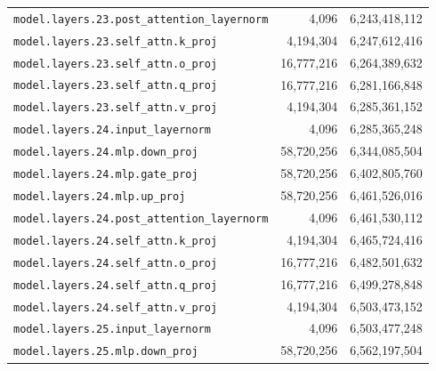 \documentclass[10pt,a4paper]{article}
\theoremstyle{definition}
\begin{document}
\begin{appendices}
\begin{longtable}{p{9.5cm}rr}
\texttt{model.\allowbreak{}layers.\allowbreak{}23.\allowbreak{}post\_attention\_layernorm} & 4,096 & 6,243,418,112 \\
\texttt{model.\allowbreak{}layers.\allowbreak{}23.\allowbreak{}self\_attn.\allowbreak{}k\_proj} & 4,194,304 & 6,247,612,416 \\
\texttt{model.\allowbreak{}layers.\allowbreak{}23.\allowbreak{}self\_attn.\allowbreak{}o\_proj} & 16,777,216 & 6,264,389,632 \\
\texttt{model.\allowbreak{}layers.\allowbreak{}23.\allowbreak{}self\_attn.\allowbreak{}q\_proj} & 16,777,216 & 6,281,166,848 \\
\texttt{model.\allowbreak{}layers.\allowbreak{}23.\allowbreak{}self\_attn.\allowbreak{}v\_proj} & 4,194,304 & 6,285,361,152 \\
\texttt{model.\allowbreak{}layers.\allowbreak{}24.\allowbreak{}input\_layernorm} & 4,096 & 6,285,365,248 \\
\texttt{model.\allowbreak{}layers.\allowbreak{}24.\allowbreak{}mlp.\allowbreak{}down\_proj} & 58,720,256 & 6,344,085,504 \\
\texttt{model.\allowbreak{}layers.\allowbreak{}24.\allowbreak{}mlp.\allowbreak{}gate\_proj} & 58,720,256 & 6,402,805,760 \\
\texttt{model.\allowbreak{}layers.\allowbreak{}24.\allowbreak{}mlp.\allowbreak{}up\_proj} & 58,720,256 & 6,461,526,016 \\
\texttt{model.\allowbreak{}layers.\allowbreak{}24.\allowbreak{}post\_attention\_layernorm} & 4,096 & 6,461,530,112 \\
\texttt{model.\allowbreak{}layers.\allowbreak{}24.\allowbreak{}self\_attn.\allowbreak{}k\_proj} & 4,194,304 & 6,465,724,416 \\
\texttt{model.\allowbreak{}layers.\allowbreak{}24.\allowbreak{}self\_attn.\allowbreak{}o\_proj} & 16,777,216 & 6,482,501,632 \\
\texttt{model.\allowbreak{}layers.\allowbreak{}24.\allowbreak{}self\_attn.\allowbreak{}q\_proj} & 16,777,216 & 6,499,278,848 \\
\texttt{model.\allowbreak{}layers.\allowbreak{}24.\allowbreak{}self\_attn.\allowbreak{}v\_proj} & 4,194,304 & 6,503,473,152 \\
\texttt{model.\allowbreak{}layers.\allowbreak{}25.\allowbreak{}input\_layernorm} & 4,096 & 6,503,477,248 \\
\texttt{model.\allowbreak{}layers.\allowbreak{}25.\allowbreak{}mlp.\allowbreak{}down\_proj} & 58,720,256 & 6,562,197,504 \\

\end{longtable}
\end{appendices}
\end{document}
